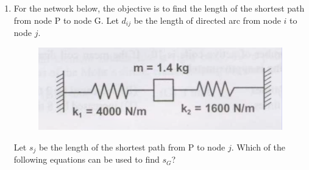 \documentclass[journal,12pt,onecolumn]{IEEEtran}
\begin{document}
\begin{enumerate}
          \begin{enumerate}
          \end{enumerate}

    \item For the network below, the objective is to find the length of the shortest path from node P to node G. Let $d_{ij}$ be the length of directed arc from node $i$ to node $j$.

          \begin{figure}[H]
              \centering
              \includegraphics[scale=0.3]{q35}
              \caption{}
              \label{q35}
          \end{figure}
          Let $s_j$ be the length of the shortest path from P to node $j$. Which of the following equations can be used to find $s_G$?

          \begin{enumerate}
          \end{enumerate}


\end{enumerate}
\end{document}
